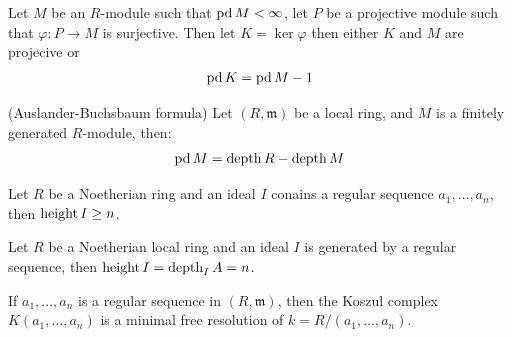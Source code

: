 \begin{lemma}
	\label{lem:projdim_ker_eq_one_less}
	Let $M$ be an $R$-module such that $\operatorname{pd} M < \infty$, let $P$ be a projective module such that $\varphi: P \to M$ is surjective.
	Then let $K = \ker \varphi$ then either $K$ and $M$ are projecive or
	$$\operatorname{pd} K = \operatorname{pd} M - 1$$
\end{lemma}

\begin{lemma}
	\label{lem:koszul_homotopy}
\end{lemma}

\begin{proposition}
	\label{prop:koszul_homology_annil_by_maximal}
\end{proposition}

\begin{theorem} (Auslander-Buchsbaum formula) Let $(R, \mathfrak{m})$ be a local ring, and $M$ is a finitely generated $R$-module, then:
	\label{thm:auslander_buchsbaum_formula}
	$$\operatorname{pd} M = \operatorname{depth} R - \operatorname{depth} M$$
\end{theorem}

\begin{lemma}
	\label{lem:depth_leq_ht}
	Let $R$ be a Noetherian ring and an ideal $I$ conains a regular sequence $a_1, \dots, a_n$, then $\operatorname{height} I \geq n$.
\end{lemma}

\begin{corollary}
	\label{lem:depth_eq_ht_if_gen}
	Let $R$ be a Noetherian local ring and an ideal $I$ is generated by a regular sequence, then $\operatorname{height} I = \operatorname{depth}_I A = n$.
\end{corollary}

\begin{corollary}
	\label{cor:koszul_min_resl_residue_iff_reg}
	If $a_1, \dots, a_n$ is a regular sequence in $(R, \mathfrak{m})$, then the Koszul complex $K(a_1, \dots, a_n)$ is a minimal free resolution of $k = R/(a_1, \dots, a_n)$.
\end{corollary}


